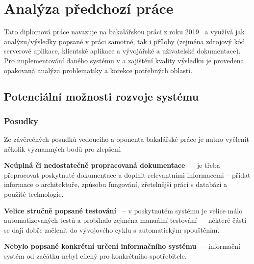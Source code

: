 
\chapter{Analýza předchozí práce}\label{ch:analysis}


Tato diplomová práce navazuje na bakalářskou práci z roku 2019~\cite{bachelorthesis} a využívá jak analýzu/výsledky popsané v práci samotné, tak i přílohy (zejména zdrojový kód serverové aplikace, klientské aplikace a vývojářské a uživatelské dokumentace).
Pro implementování daného systému v  a zajištění kvality výsledku je provedena opakovaná analýza problematiky a korekce potřebných oblastí.



\section{Potenciální možnosti rozvoje systému}



\subsection{Posudky}
Ze závěrečných posudků vedoucího a oponenta bakalářské práce je nutno vyčlenit několik významných bodů pro zlepšení.

\begin{ul}
   \item
   \textbf{Neúplná či nedostatečně propracovaná dokumentace~\cite{bachelorthesisreportsupervisor}} – je třeba přepracovat poskytnuté dokumentace a doplnit relevantními informacemi – přidat informace o architektuře, způsobu fungování, zřetelnější práci s databází a použité technologie.
   \clearpage

   \item
   \textbf{Velice stručně popsané testování~\cite{bachelorthesisreportreviewer}} – v poskytnutém systému je velice málo automatizovaných testů a probíhalo zejména manuální testování~\cite{bachelorthesis} – některé části se dají dobře začlenit do vývojového cyklu s automatickým spouštěním.

   \item
   \textbf{Nebylo popsané konkrétní určení informačního systému~\cite{bachelorthesisreportreviewer}} – informační systém od začátku nebyl cílený pro konkrétního spotřebitele.
\end{ul}

